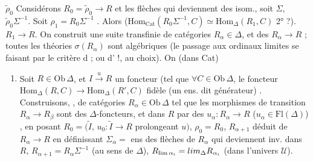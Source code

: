 \documentclass[11pt,a4paper]{article}
\begin{document}
 $\tilde{\rho}_{0}$ Considérons $R_{0} = \tilde{\rho}_{0}
\to R$ et les flèches qui deviennent des isom., soit $\Sigma$, \ill{}
$\tilde{\rho}_{0}\Sigma^{-1}$. Soit \struck{\ill{}} $\rho_{1} = R_{0}
\Sigma^{-1}$ . Alors
($\mathrm{Hom}_{\mathrm{Cat}}(R_{0}\Sigma^{-1}, C) \simeq
\mathrm{Hom}_{\Delta}(R_{1}, C)$ \ill{} 2° ?). $R_{1} \to R$. On construit
une suite transfinie de catégories $R_{\alpha} \in \Delta$, et des
$R_{\alpha} \to R$ ; toutes les théories $\sigma(R_{\alpha})$ sont
algébriques (le passage aux  ordinaux limites se faisant par
le critère d ; ou d' !, au choix). On \ill{} \struck{\ill{}} (dans Cat)


\begin{enumerate}
  \item[4°)] Soit $R \in \mathrm{Ob}\,\Delta$, et $I \xrightarrow{u} R$
    un foncteur \struck{\ill{}} (tel que $\forall C \in \mathrm{Ob}\,
    \Delta$, le foncteur $\mathrm{Hom}_{\Delta}(R, C) \to
    \mathrm{Hom}_{\Delta}(R', C)$ fidèle \struck{\ill{}} (un ens. dit
    générateur) . Construisons, , de catégories $R_{\alpha} \in \mathrm{Ob}\,\Delta$
     tel
    que les morphismes de transition $R_{\alpha} \to R_{\beta}$ sont des
    $\Delta$-foncteurs, et  \ill{}
    \ill{} dans $R$ par des $u_{\alpha} : R_{\alpha} \to R$ ($u_{\alpha}
    \in \mathrm{Fl}(\Delta)$) , en posant $R_{0} = (\tilde{I}$, \struck{\ill{}} $u_{0} :
    \tilde{I} \to R$ prolongeant $u)$, $\rho_{0} = R_{0}$, $R_{\alpha+1}$
    déduit de $R_{\alpha} \to R$ en définissant $\Sigma_{\alpha} = $ ens
    des flèches de $R_{\alpha}$ qui deviennent inv. dans $R$,
    $R_{\alpha+1} = R_{\alpha}\Sigma^{-1}$  (au sens de $\Delta$), $R_{\lim \alpha_{i}} =
    \varinjlim_{\Delta} R_{\alpha_{i}}$ (dans l'univers $\mathcal{U}$).
\end{enumerate}
\end{document}
